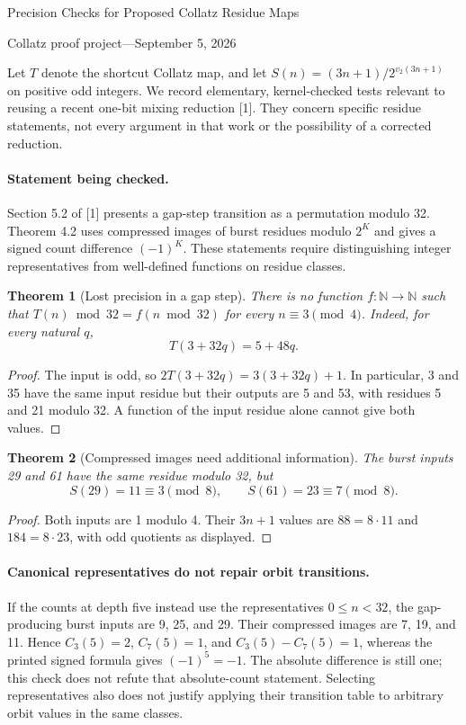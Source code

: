 \documentclass[11pt]{article}
\newtheorem{theorem}{Theorem}
\begin{document}
\begin{center}
{\Large Precision Checks for Proposed Collatz Residue Maps}\par\medskip
Collatz proof project\quad---\quad September 5, 2026
\end{center}
Let $T$ denote the shortcut Collatz map, and let
$S(n)=(3n+1)/2^{v_2(3n+1)}$ on positive odd integers.
We record elementary, kernel-checked tests relevant to reusing a recent
one-bit mixing reduction [1]. They concern specific residue statements,
not every argument in that work or the possibility of a corrected reduction.

\paragraph{Statement being checked.}
Section 5.2 of [1] presents a gap-step transition as a permutation modulo 32.
Theorem 4.2 uses compressed images of burst residues modulo $2^K$ and gives
a signed count difference $(-1)^K$. These statements require distinguishing
integer representatives from well-defined functions on residue classes.

\begin{theorem}[Lost precision in a gap step]
There is no function $f:\mathbb N\to\mathbb N$ such that
$T(n)\bmod32=f(n\bmod32)$ for every $n\equiv3\pmod4$.
Indeed, for every natural $q$,
\[
 T(3+32q)=5+48q.
\]
\end{theorem}
\begin{proof}
The input is odd, so $2T(3+32q)=3(3+32q)+1$.
In particular, 3 and 35 have the same input residue but their outputs
are 5 and 53, with residues 5 and 21 modulo 32.
A function of the input residue alone cannot give both values.
\end{proof}

\begin{theorem}[Compressed images need additional information]
The burst inputs 29 and 61 have the same residue modulo 32, but
\[
 S(29)=11\equiv3\pmod8,\qquad
 S(61)=23\equiv7\pmod8.
\]
\end{theorem}
\begin{proof}
Both inputs are 1 modulo 4. Their $3n+1$ values are
$88=8\cdot11$ and $184=8\cdot23$, with odd quotients as displayed.
\end{proof}

\paragraph{Canonical representatives do not repair orbit transitions.}
If the counts at depth five instead use the representatives
$0\leq n<32$, the gap-producing burst inputs are 9, 25, and 29.
Their compressed images are 7, 19, and 11. Hence
$C_3(5)=2$, $C_7(5)=1$, and $C_3(5)-C_7(5)=1$, whereas the printed
signed formula gives $(-1)^5=-1$. The absolute difference is still one;
this check does not refute that absolute-count statement.
Selecting representatives also does not justify applying their transition
table to arbitrary orbit values in the same classes.
\end{document}

